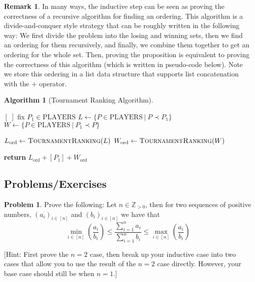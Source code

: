 \documentclass{article}
\newcommand{\ZZZ}{\mathbb{Z}_{> 0}}
\theoremstyle{plain}
\theoremstyle{definition}
\newtheorem{problem}{Problem}
\newtheorem{remark}{Remark}
\newtheorem{algorithm}{Algorithm}
\begin{document}
\begin{remark}
    In many ways, the inductive step can be seen as proving the correctness of a recursive algorithm for finding an ordering. This algorithm is a divide-and-conquer style strategy that can be roughly written in the following way: We first divide the problem into the losing and winning sets, then we find an ordering for them recursively, and finally, we combine them together to get an ordering for the whole set. Then, proving the proposition is equivalent to proving the correctness of this algorithm (which is written in pseudo-code below). Note we store this ordering in a list data structure that supports list concatenation with the \(+\) operator.
    \begin{algorithm}[Tournament Ranking Algorithm] \phantom{}\label{alg_tourn_ranking}
    
    \begin{center}
    \begin{minipage}{.5\linewidth}
    \begin{algorithmic}[1]
                \Return \([\;]\)
            \Else
                \State fix \(P_1 \in \text{PLAYERS}\)
                \State \(L \leftarrow \{P \in \text{PLAYERS}\ |\ P \prec P_1\}\)
                \State \(W \leftarrow \{P \in \text{PLAYERS}\ |\ P_1 \prec P\}\)

                \State \(L_{\text{ord}} \leftarrow \textsc{TournamentRanking}(L)\)
                \State \(W_{\text{ord}} \leftarrow \textsc{TournamentRanking}(W)\)
                
                \State \textbf{return} \(L_{\text{ord}} + [P_1] + W_{\text{ord}}\)
            \EndIf 
        \EndProcedure
    \end{algorithmic}
    \end{minipage}
    \end{center}
    \end{algorithm}
\end{remark}

\subsection{Problems/Exercises}

\begin{problem}
    Prove the following:
    Let \(n \in \ZZZ\), then for two sequences of positive numbers, \((a_i)_{i \in [n]}\) and \((b_i)_{i \in [n]}\) we have that
    \[\min_{i \in [n]} \left(\frac{a_i}{b_i}\right) \leq \frac{\sum_{i = 1}^n a_i}{\sum_{i = 1}^n b_i} \leq \max_{i \in [n]} \left(\frac{a_i}{b_i}\right)\]

    [Hint: First prove the \(n=2\) case, then break up your inductive case into two cases that allow you to use the result of the \(n=2\) case directly. However, your base case should still be when \(n=1\).]
\end{problem}
\end{document}
